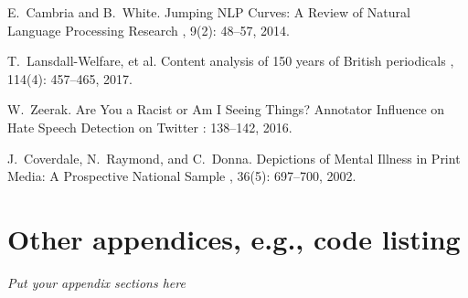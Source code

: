\documentclass{report}
\begin{document}
\begin{thebibliography}{HHM99}  %
  
E.~Cambria and B.~White.
\newblock Jumping NLP Curves: A Review of Natural Language Processing Research
, 9(2):  48--57, 2014.

T.~Lansdall-Welfare, et al.
\newblock Content analysis of 150 years of British periodicals
, 114(4):  457--465, 2017.

W.~Zeerak.
\newblock Are You a Racist or Am I Seeing Things? Annotator Influence on Hate Speech Detection on Twitter
:  138--142, 2016.

J.~Coverdale, N.~Raymond, and C.~Donna.
\newblock Depictions of Mental Illness in Print Media: A Prospective National Sample
, 36(5):  697--700, 2002.

\end{thebibliography}

\chapter{Other appendices, e.g., code listing}
\emph{Put your appendix sections here}
\end{document}
